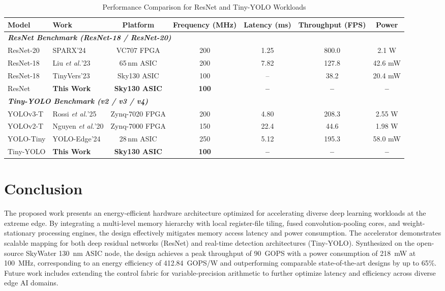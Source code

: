 \documentclass[conference]{IEEEtran}
\begin{document}
\begin{table}[t]
\centering
\caption{Performance Comparison for ResNet and Tiny-YOLO Workloads}
\label{tab:model_comparison}
\footnotesize
\setlength{\tabcolsep}{8pt}
\begin{tabular}{@{}llccccc@{}}
\hline
\textbf{Model} & \textbf{Work} & \textbf{Platform} & \textbf{Frequency (MHz)} & \textbf{Latency (ms)} & \textbf{Throughput (FPS)} & \textbf{Power} \\
\hline
\multicolumn{7}{l}{\textit{\textbf{ResNet Benchmark (ResNet-18 / ResNet-20)}}} \\
\hline
ResNet-20 & SPARX'24 \cite{sparx2024}     & VC707 FPGA   & 200 & 1.25 & 800.0 & 2.1 W \\
ResNet-18 & Liu \textit{et al.}'23 \cite{liu2023tvlsi} & 65\,nm ASIC  & 200 & 7.82 & 127.8 & 42.6 mW \\
ResNet-18 & TinyVers'23 \cite{TinyVers}   & Sky130 ASIC  & 100 & --   & 38.2  & 20.4 mW \\
ResNet    & \textbf{This Work}            & \textbf{Sky130 ASIC} & \textbf{100} & \textbf{--} & \textbf{--} & \textbf{--} \\
\hline
\multicolumn{7}{l}{\textit{\textbf{Tiny-YOLO Benchmark (v2 / v3 / v4)}}} \\
\hline
YOLOv3-T  & Rossi \textit{et al.}'25 \cite{yolov3tiny2025} & Zynq-7020 FPGA & 200 & 4.80 & 208.3 & 2.55 W \\
YOLOv2-T  & Nguyen \textit{et al.}'20 \cite{nguyen2020tcas} & Zynq-7000 FPGA & 150 & 22.4 & 44.6  & 1.98 W \\
YOLO-Tiny & YOLO-Edge'24 \cite{yoloedge2024} & 28\,nm ASIC & 250 & 5.12 & 195.3 & 58.0 mW \\
Tiny-YOLO & \textbf{This Work}            & \textbf{Sky130 ASIC} & \textbf{100} & \textbf{--} & \textbf{--} & \textbf{--} \\
\hline
\end{tabular}
\end{table}

\section{Conclusion}
\label{sec:conclusion}
The proposed work presents an energy-efficient hardware architecture optimized for accelerating diverse deep learning workloads at the extreme edge. By integrating a multi-level memory hierarchy with local register-file tiling, fused convolution-pooling cores, and weight-stationary processing engines, the design effectively mitigates memory access latency and power consumption. The accelerator demonstrates scalable mapping for both deep residual networks (ResNet) and real-time detection architectures (Tiny-YOLO). Synthesized on the open-source SkyWater 130~nm ASIC node, the design achieves a peak throughput of 90~GOPS with a power consumption of 218~mW at 100~MHz, corresponding to an energy efficiency of 412.84~GOPS/W and outperforming comparable state-of-the-art designs by up to 65\%. Future work includes extending the control fabric for variable-precision arithmetic to further optimize latency and efficiency across diverse edge AI domains.


\end{document}
